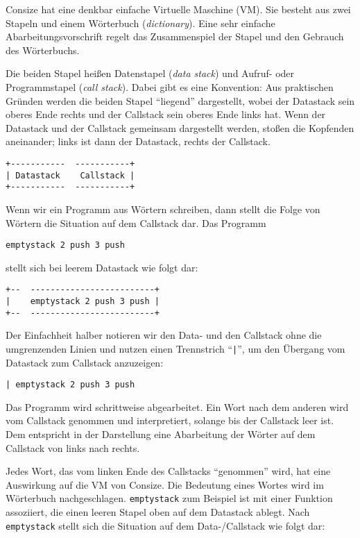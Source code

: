 Consize hat eine denkbar einfache Virtuelle Maschine (VM). Sie besteht aus zwei Stapeln und einem Wörterbuch (\emph{dictionary}). Eine sehr einfache Abarbeitungsvorschrift regelt das Zusammenspiel der Stapel und den Gebrauch des Wörterbuchs.

Die beiden Stapel heißen Datenstapel (\emph{data stack}) und Aufruf- oder Programmstapel (\emph{call stack}). Dabei gibt es eine Konvention: Aus praktischen Gründen werden die beiden Stapel "`liegend"' dargestellt, wobei der Datastack sein oberes Ende rechts und der Callstack sein oberes Ende links hat. Wenn der Datastack und der Callstack gemeinsam dargestellt werden, stoßen die Kopfenden aneinander; links ist dann der Datastack, rechts der Callstack.

\begin{verbatim}
+-----------  -----------+
| Datastack    Callstack |
+-----------  -----------+
\end{verbatim}

Wenn wir ein Programm aus Wörtern schreiben, dann stellt die Folge von Wörtern die Situation auf dem Callstack dar. Das Programm

\begin{verbatim}
emptystack 2 push 3 push
\end{verbatim}

stellt sich bei leerem Datastack wie folgt dar:

\begin{verbatim}
+--  -------------------------+
|    emptystack 2 push 3 push |
+--  -------------------------+
\end{verbatim}

Der Einfachheit halber notieren wir den Data- und den Callstack ohne die umgrenzenden Linien und nutzen einen Trennstrich "`\verb!|!"', um den Übergang vom Datastack zum Callstack anzuzeigen:

\begin{verbatim}
| emptystack 2 push 3 push
\end{verbatim}

Das Programm wird schrittweise abgearbeitet. Ein Wort nach dem anderen wird vom Callstack genommen und interpretiert, solange bis der Callstack leer ist. Dem entspricht in der Darstellung eine Abarbeitung der Wörter auf dem Callstack von links nach rechts.

Jedes Wort, das vom linken Ende des Callstacks "`genommen"' wird, hat eine Auswirkung auf die VM von Consize. Die Bedeutung eines Wortes wird im Wörterbuch nachgeschlagen. \verb|emptystack| zum Beispiel ist mit einer Funktion assoziiert, die einen leeren Stapel oben auf dem Datastack ablegt. Nach \verb|emptystack| stellt sich die Situation auf dem Data-\slash Callstack wie folgt dar:


